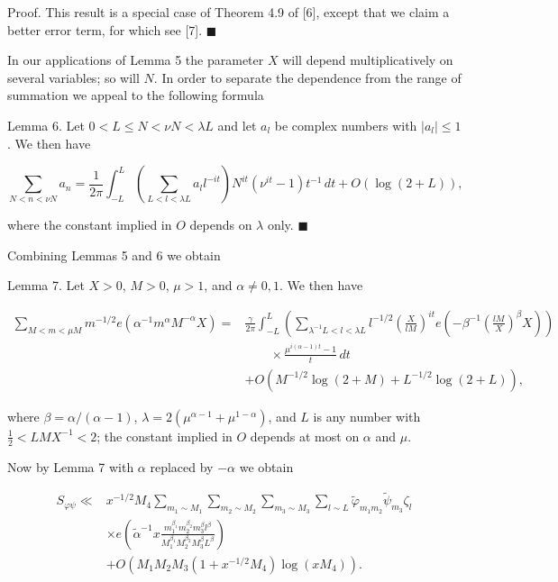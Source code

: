 \documentclass[10pt]{article}
\newcommand{\proofend}{\hfill\(\blacksquare\)}
\begin{document}
Proof. This result is a special case of Theorem 4.9 of [6], except that we claim a better error term, for which see [7]. \proofend

In our applications of Lemma 5 the parameter $X$ will depend multiplicatively on several variables; so will $N$. In order to separate the dependence from the range of summation we appeal to the following formula

Lemma 6. Let $0<L\leqslant N<\nu N<\lambda L$ and let $a_l$ be
complex numbers with $|a_l|\leqslant1$. We then have

$$
\sum_{N<n<\nu N}a_n=\frac{1}{2\pi}\int_{-L}^{L}
\left(\sum_{L<l<\lambda L}a_l l^{-it}\right)
N^{it}\left(\nu^{it}-1\right)t^{-1}\,dt+O(\log(2+L)),
$$

where the constant implied in $O$ depends on $\lambda$ only. \proofend

Combining Lemmas 5 and 6 we obtain

Lemma 7. Let $X>0$, $M>0$, $\mu>1$, and $\alpha\neq0,1$. We then have

$$
\begin{aligned}
\sum_{M<m<\mu M}m^{-1/2}e\left(\alpha^{-1}m^{\alpha}M^{-\alpha}X\right)
={}&\frac{\gamma}{2\pi}\int_{-L}^{L}
\left(\sum_{\lambda^{-1}L<l<\lambda L}l^{-1/2}
\left(\frac{X}{lM}\right)^{it}
 e\left(-\beta^{-1}\left(\frac{lM}{X}\right)^{\beta}X\right)\right)\\
&\qquad\times\frac{\mu^{i(\alpha-1)t}-1}{t}\,dt\\
&+O\left(M^{-1/2}\log(2+M)+L^{-1/2}\log(2+L)\right),
\end{aligned}
$$

where $\beta=\alpha/(\alpha-1)$,
$\lambda=2\left(\mu^{\alpha-1}+\mu^{1-\alpha}\right)$, and $L$ is any
number with $\frac12<LMX^{-1}<2$; the constant implied in $O$ depends at
most on $\alpha$ and $\mu$.

Now by Lemma 7 with $\alpha$ replaced by $-\alpha$ we obtain

$$
\begin{aligned}
S_{\varphi\psi}\ll{}&x^{-1/2}M_4
\sum_{m_1\sim M_1}\sum_{m_2\sim M_2}\sum_{m_3\sim M_3}\sum_{l\sim L}
\tilde\varphi_{m_1m_2}\tilde\psi_{m_3}\zeta_l\\
&\times e\left(\tilde\alpha^{-1}x
\frac{m_1^{\beta_1}m_2^{\beta_2}m_3^{\beta}l^{\beta}}
{M_1^{\beta_1}M_2^{\beta_2}M_3^{\beta}L^{\beta}}\right)\\
&+O\left(M_1M_2M_3\left(1+x^{-1/2}M_4\right)\log(xM_4)\right).
\end{aligned}
$$
\end{document}
